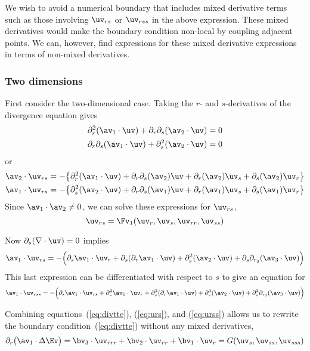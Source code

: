 \documentclass[10pt]{article}
\newcommand{\grad}{\nabla}
\begin{document}
We wish to avoid a numerical boundary that includes mixed derivative terms such as those involving
$\uv_{rs}$ or $\uv_{rss}$ in the above expression. These mixed derivatives would make the 
boundary condition non-local by coupling adjacent points. We can, however, find expressions
for these mixed derivative expressions in terms of non-mixed derivatives.

\subsubsection{Two dimensions}

First consider the two-dimensional case.
Taking the $r$- and $s$-derivatives of the divergence equation gives
\begin{align*}
   \partial_r^2(\av_1\cdot\uv) + \partial_r\partial_s(\av_2\cdot\uv) &=0 \\
   \partial_r\partial_s(\av_1\cdot\uv) + \partial_s^2(\av_2\cdot\uv) &=0
\end{align*}
or
\begin{align*}
 \av_2\cdot\uv_{rs} &= -\big\{ \partial_r^2(\av_1\cdot\uv) + \partial_r\partial_s(\av_2)\uv 
                  + \partial_r(\av_2)\uv_s + \partial_s(\av_2)\uv_r\big\}   \\
 \av_1\cdot\uv_{rs} &= -\big\{ \partial_s^2(\av_2\cdot\uv) + \partial_r\partial_s(\av_1)\uv 
                     + \partial_r(\av_1)\uv_s + \partial_s(\av_1)\uv_r  \big\} 
\end{align*}
Since $\av_1\cdot\av_2\ne 0$, we can solve these expressions for $\uv_{rs}$,
\begin{equation}
   \uv_{rs} = \Fv_1(\uv_r,\uv_s,\uv_{rr},\uv_{ss})  \label{eq:urs}
\end{equation}

Now $\partial_s(\grad\cdot\uv)=0$ implies
\[
   \av_1 \cdot \uv_{rs} = -\Big( \partial_s\av_1\cdot\uv_r +
       \partial_s( \partial_r\av_1\cdot\uv) + \partial_s^2(\av_2\cdot\uv)+ \partial_s\prc(\av_3\cdot\uv) \Big)
\]
This last expression can be differentiated with respect to $s$ to give an equation
for 
\begin{equation}
\av_1 \cdot \uv_{rss} =  -\Big( \partial_s\av_1\cdot\uv_{rs} + \partial_s^2\av_1\cdot\uv_{r} +
       \partial_s^2( \partial_r\av_1\cdot\uv) + \partial_s^3(\av_2\cdot\uv)
           + \partial_s^2\prc(\av_3\cdot\uv) \Big)  \label{eq:urss}
\end{equation}

Combining equations~(\ref{eq:divtte}), (\ref{eq:urs}), and (\ref{eq:urss}) allows us to rewrite
the boundary condition~(\ref{eq:divtte}) without any mixed derivatives,
\begin{equation}
  \partial_r\big(\av_1\cdot \Delta\Ev \big) =
    \bv_3\cdot\uv_{rrr} + \bv_2\cdot\uv_{rr} + \bv_1\cdot\uv_{r} = G(\uv_s,\uv_{ss},\uv_{sss})
\end{equation}
\end{document}
